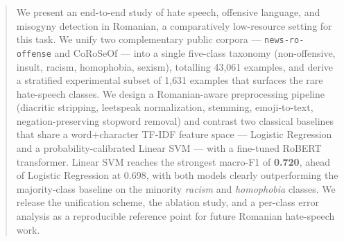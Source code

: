 \begin{abstract}
\label{abstract}

We present an end-to-end study of hate speech, offensive language, and misogyny detection in Romanian, a comparatively low-resource setting for this task. We unify two complementary public corpora --- \texttt{news-ro-offense} and CoRoSeOf --- into a single five-class taxonomy (non-offensive, insult, racism, homophobia, sexism), totalling 43{,}061 examples, and derive a stratified experimental subset of 1{,}631 examples that surfaces the rare hate-speech classes. We design a Romanian-aware preprocessing pipeline (diacritic stripping, leetspeak normalization, stemming, emoji-to-text, negation-preserving stopword removal) and contrast two classical baselines that share a word+character TF-IDF feature space --- Logistic Regression and a probability-calibrated Linear SVM --- with a fine-tuned RoBERT transformer. Linear SVM reaches the strongest macro-F1 of \textbf{0.720}, ahead of Logistic Regression at 0.698, with both models clearly outperforming the majority-class baseline on the minority \textit{racism} and \textit{homophobia} classes. We release the unification scheme, the ablation study, and a per-class error analysis as a reproducible reference point for future Romanian hate-speech work.

\end{abstract}
